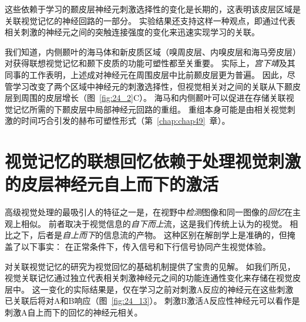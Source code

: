 这些依赖于学习的颞皮层神经元刺激选择性的变化是长期的，这表明该皮层区域是关联视觉记忆的神经回路的一部分。
实验结果还支持这样一种观点，即通过代表相关刺激的神经元之间的突触连接强度的变化来迅速实现学习的关联。


我们知道，内侧颞叶的海马体和新皮质区域（嗅周皮层、内嗅皮层和海马旁皮层）对获得联想视觉记忆和颞下皮质的功能可塑性都至关重要。
实际上，\textit{宫下靖}及其同事的工作表明，上述成对神经元在周围皮层中比前颞皮层更为普遍。
因此，尽管学习改变了两个区域中神经元的刺激选择性，但视觉相关对之间的关联从下颞皮层到周围的皮层增长（图~\ref{fig:24_2}C）。
海马和内侧颞叶可以促进在存储关联视觉记忆所需的下颞皮层中局部神经元回路的重组。
重组本身可能是由相关视觉刺激的时间巧合引发的赫布可塑性形式（第~\ref{chap:chap49}~章）。



\section{视觉记忆的联想回忆依赖于处理视觉刺激的皮层神经元自上而下的激活}

高级视觉处理的最吸引人的特征之一是，在视野中\textit{检测}图像和同一图像的\textit{回忆}在主观上相似。
前者取决于视觉信息的\textit{自下而上}流，这是我们传统上认为的视觉。
相比之下，后者是\textit{自上而下}的信息流的产物。
这种区别在解剖学上是准确的，但掩盖了以下事实：
在正常条件下，传入信号和下行信号协同产生视觉体验。


对关联视觉记忆的研究为视觉回忆的基础机制提供了宝贵的见解。
如我们所见，视觉关联记忆通过独立代表相关刺激神经元之间的功能连通性变化来存储在视觉皮层中。
这一变化的实际结果是，仅在学习之前对刺激A反应的神经元在这些刺激已关联后将对A和B响应（图~\ref{fig:24_13}）。
刺激B激活A反应性神经元可以看作是刺激A自上而下的回忆的神经元相关。


